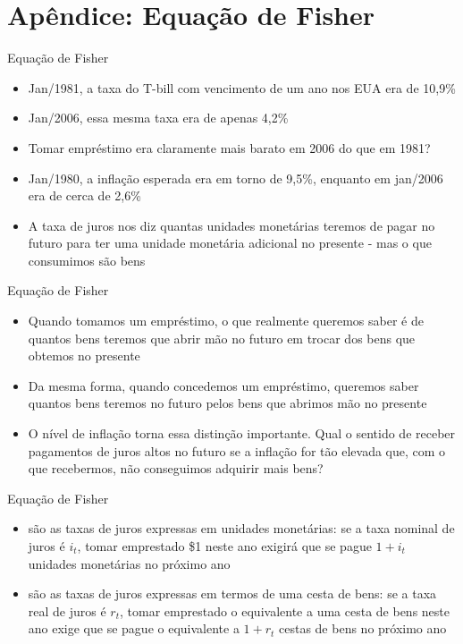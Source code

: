 \documentclass[10pt]{beamer}
\begin{document}
\section{Apêndice: Equação de Fisher}\label{ap1}
\begin{frame}{Equação de Fisher}
    \begin{itemize}
        \item Jan/1981, a taxa do T-bill com vencimento de um ano nos EUA era de 10,9\%\bigskip

        \item Jan/2006, essa mesma taxa era de apenas 4,2\%\bigskip

        \item Tomar empréstimo era claramente mais barato em 2006 do que em 1981?\bigskip

        \item Jan/1980, a inflação esperada era em torno de 9,5\%, enquanto em jan/2006 era de cerca de 2,6\%\bigskip

        \item A taxa de juros nos diz quantas unidades monetárias teremos de pagar no futuro para ter uma unidade monetária adicional no presente - mas o que consumimos são bens
    \end{itemize}
\end{frame}

\begin{frame}{Equação de Fisher}
    \begin{itemize}
        \item Quando tomamos um empréstimo, o que realmente queremos saber é de quantos bens teremos que abrir mão no futuro em trocar dos bens que obtemos no presente\bigskip

        \item Da mesma forma, quando concedemos um empréstimo, queremos saber quantos bens teremos no futuro pelos bens que abrimos mão no presente\bigskip

        \item O nível de inflação torna essa distinção importante. Qual o sentido de receber pagamentos de juros altos no futuro se a inflação for tão elevada que, com o que recebermos, não conseguimos adquirir mais bens?
    \end{itemize}
\end{frame}

\begin{frame}{Equação de Fisher}
    \begin{itemize}
        \item {} são as taxas de juros expressas em unidades monetárias: se a taxa nominal de juros é $i_t$, tomar emprestado \$1 neste ano exigirá que se pague $1 + i_t$ unidades monetárias no próximo ano\bigskip

        \item {} são as taxas de juros expressas em termos de uma cesta de bens: se a taxa real de juros é $r_t$, tomar emprestado o equivalente a uma cesta de bens neste ano exige que se pague o equivalente a $1 + r_t$ cestas de bens no próximo ano\bigskip
    \end{itemize}
\end{frame}
\end{document}
